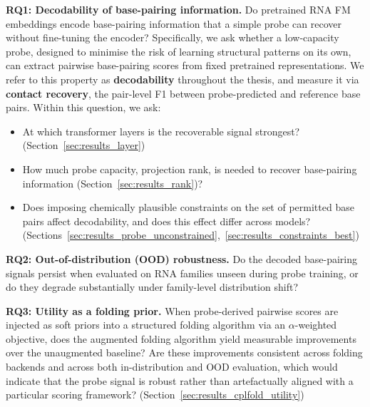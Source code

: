 \documentclass[logo,bsc,singlespacing,parskip]{infthesis}
\begin{document}
\textbf{RQ1: Decodability of base-pairing information.}
Do pretrained RNA FM embeddings encode base-pairing information
that a simple probe can recover without fine-tuning the encoder?
Specifically, we ask whether a low-capacity probe, designed to
minimise the risk of learning structural patterns on its own,
can extract pairwise base-pairing scores from fixed pretrained
representations. We refer to this property as
\textbf{decodability} throughout the thesis, and measure it via \textbf{contact recovery}, the pair-level F1 between probe-predicted and reference base pairs. Within this question, we ask: 
\begin{itemize}
  \item[\textbf{(a)}] At which transformer layers is the
    recoverable signal strongest? (Section~\ref{sec:results_layer})
  \item [\textbf{(b)}] How much probe capacity, projection rank, is needed to recover base-pairing information (Section~\ref{sec:results_rank})?
  \item[\textbf{(c)}] Does imposing chemically plausible
    constraints on the set of permitted base pairs affect decodability, and does this effect differ across models? (Sections~\ref{sec:results_probe_unconstrained},~\ref{sec:results_constraints_best})
\end{itemize}

\textbf{RQ2: Out-of-distribution (OOD) robustness.}
Do the decoded base-pairing signals persist when evaluated on RNA
families unseen during probe training, or do they degrade substantially
under family-level distribution shift?

\textbf{RQ3: Utility as a folding prior.} 
When probe-derived pairwise scores are injected as soft priors into a structured folding algorithm via an $\alpha$-weighted objective, does the augmented folding algorithm yield measurable improvements over the unaugmented baseline? Are these improvements consistent across folding backends and across both in-distribution and OOD evaluation, which would indicate that the probe signal is robust rather than artefactually aligned with a particular scoring framework? (Section~\ref{sec:results_cplfold_utility})
\end{document}
